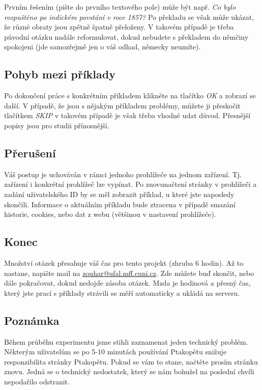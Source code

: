 Prvním řešením (pište do prvního textového pole) může být např. \textit{Co bylo rozpuštěno po indickém povstání v roce 1857?} Po překladu se však může ukázat, že různé obraty jsou zpětně špatně přeloženy. V takovém případě je třeba původní otázku nadále reformulovat, dokud nebudete s překladem do němčiny spokojeni (jde samozřejmě jen o váš odhad, německy neumíte).

\subsection*{Pohyb mezi příklady}

Po dokončení práce s konkrétním příkladem klikněte na tlačítko \textit{OK} a zobrazí se další. V případě, že jsou s nějakým příkladem problémy, můžete ji přeskočit tlačítkem \textit{SKIP} v takovém případě je však třeba vhodné udat důvod. Přesnější popisy jsou pro studii přínosnější.

\subsection*{Přerušení}
Váš postup je uchováván v rámci jednoho prohlížeče na jednom zařízení. Tj. zařízení i konkrétní prohlížeč lze vypínat. Po znovunačtení stránky v prohlížeči a zadání uživatelského ID by se měl zobrazit příklad, u které jste naposledy skončili. Informace o aktuálním příkladu bude ztracena v případě smazání historie, cookies, nebo dat z webu (většinou v nastavení prohlížeče).

\subsection*{Konec}

Množství otázek přesahuje váš čas pro tento projekt (zhruba 6 hodin). Až to nastane, napište mail na \href{mailto:zouhar@ufal.mff.cuni.cz}{zouhar@ufal.mff.cuni.cz}. Zde můžete buď skončit, nebo dále pokračovat, dokud nedojde zásoba otázek. Mzda je hodinová a přesný čas, který jste prací s příklady strávili se měří automaticky a ukládá na serveru.

\subsection*{Poznámka}
Během průběhu experimentu jsme stihli zaznamenat jeden technický problém. Některým uživatelům se po 5-10 minutách používání Ptakopětu snižuje responzibilita stránky Ptakopětu. Pokud se vám to stane, načtěte prosím stránku znovu.
Jedná se o technický nedostatek, který se nám bohužel na poslední chvíli nepodařilo odstranit.